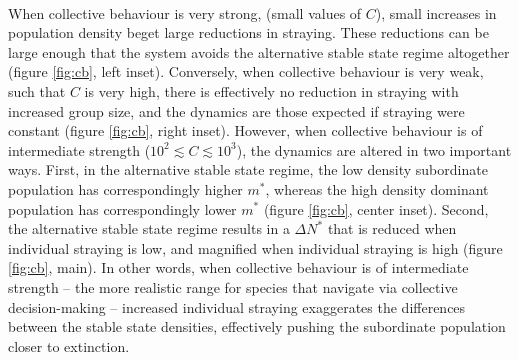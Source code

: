 \documentclass{revtex4}
\begin{document}
 \\
When collective behaviour is very strong, (small values of $C$), small increases in population density beget large reductions in straying.
These reductions can be large enough that the system avoids the alternative stable state regime altogether (figure \ref{fig:cb}, left inset).
Conversely, when collective behaviour is very weak, such that $C$ is very high, there is effectively no reduction in straying with increased group size, and the dynamics are those expected if straying were constant (figure \ref{fig:cb}, right inset).
However, when collective behaviour is of intermediate strength ($10^{2} \lesssim C \lesssim 10^3$), the dynamics are altered in two important ways.
First, in the alternative stable state regime, the low density subordinate population has correspondingly higher $m^*$, whereas the high density dominant population has correspondingly lower $m^*$ (figure \ref{fig:cb}, center inset).
Second, the alternative stable state regime results in a $\Delta N^*$ that is reduced when individual straying is low, and magnified when individual straying is high (figure \ref{fig:cb}, main).
In other words, when collective behaviour is of intermediate strength -- the more realistic range for species that navigate via collective decision-making -- increased individual straying exaggerates the differences between the stable state densities, effectively pushing the subordinate population closer to extinction.
\end{document}
